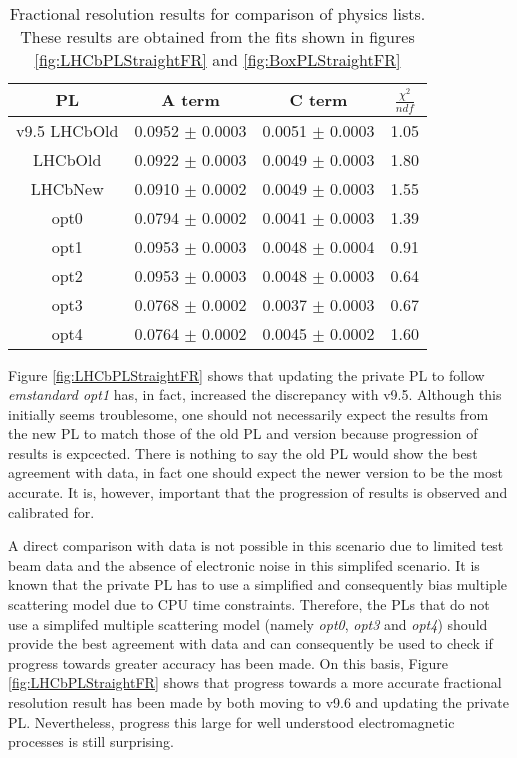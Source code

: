 \begin{table}[h]
  \centering
  \begin{tabular}{|c|c|c|c|}
      \hline
      PL & A term & C term & $\frac{\chi^2}{ndf}$  \\ \hline
      v9.5 LHCbOld & 0.0952 $\pm$ 0.0003 & 0.0051 $\pm$ 0.0003 & 1.05 \\ \hline
      LHCbOld & 0.0922 $\pm$ 0.0003 & 0.0049 $\pm$ 0.0003 & 1.80 \\ \hline 
      LHCbNew & 0.0910 $\pm$ 0.0002 & 0.0049 $\pm$ 0.0003 & 1.55 \\ \hline
      opt0 & 0.0794 $\pm$ 0.0002 & 0.0041 $\pm$ 0.0003 & 1.39 \\ \hline
      opt1 & 0.0953 $\pm$ 0.0003 & 0.0048 $\pm$ 0.0004 & 0.91 \\ \hline
      opt2 & 0.0953 $\pm$ 0.0003 & 0.0048 $\pm$ 0.0003 & 0.64 \\ \hline 
      opt3 & 0.0768 $\pm$ 0.0002 & 0.0037 $\pm$ 0.0003 & 0.67 \\ \hline 
      opt4 & 0.0764 $\pm$ 0.0002 & 0.0045 $\pm$ 0.0002 & 1.60 \\ \hline
  \end{tabular}
  \caption{Fractional resolution results for comparison of \geant physics lists.  These results are obtained from the fits shown in figures \ref{fig:LHCbPLStraightFR} and \ref{fig:BoxPLStraightFR}}
  \label{tab:AllPL}
\end{table}

Figure \ref{fig:LHCbPLStraightFR} shows that updating the \lhcb private PL to follow \textit{emstandard opt1} has, in fact, increased the discrepancy with v9.5.  Although this initially seems troublesome, one should not necessarily expect the results from the new PL to match those of the old PL and \geant version because progression of results is expcected.  There is nothing to say the old PL would show the best agreement with data, in fact one should expect the newer version to be the most accurate.  It is, however, important that the progression of results is observed and calibrated for.

A direct comparison with data is not possible in this scenario due to limited test beam data and the absence of electronic noise in this simplifed scenario.   It is known that the \lhcb private PL has to use a simplified and consequently bias multiple scattering model due to CPU time constraints.  Therefore, the PLs that do not use a simplifed multiple scattering model (namely \textit{opt0}, \textit{opt3} and \textit{opt4}) should provide the best agreement with data and can consequently be used to check if progress towards greater accuracy has been made.  On this basis, Figure \ref{fig:LHCbPLStraightFR} shows that progress towards a more accurate fractional resolution result has been made by both moving to \geant v9.6 and updating the \lhcb private PL. Nevertheless, progress this large for well understood electromagnetic processes is still surprising.

